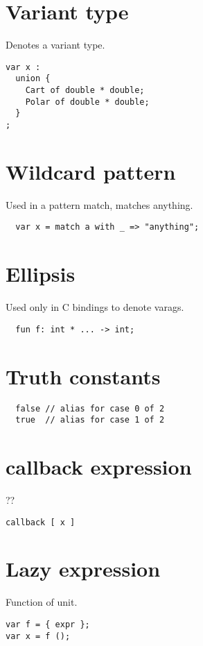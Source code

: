 \documentclass[oneside]{book}
\begin{document}
\section{Variant type}
Denotes a variant type.

\begin{verbatim}
var x : 
  union {
    Cart of double * double;
    Polar of double * double;
  }
;
\end{verbatim}


\section{Wildcard pattern}
Used in a pattern match, matches anything.

\begin{verbatim}
  var x = match a with _ => "anything";
\end{verbatim}


\section{Ellipsis}
Used only in C bindings to denote varags.

\begin{verbatim}
  fun f: int * ... -> int;
\end{verbatim}


\section{Truth constants}

\begin{verbatim}
  false // alias for case 0 of 2
  true  // alias for case 1 of 2
\end{verbatim}


\section{callback expression}
??

\begin{verbatim}
callback [ x ]
\end{verbatim}


\section{Lazy expression}
Function of unit.

\begin{verbatim}
var f = { expr };
var x = f ();
\end{verbatim}
\end{document}
